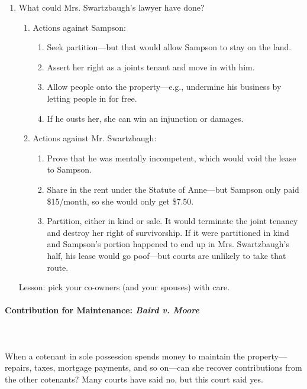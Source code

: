 \begin{enumerate}
    existing contracts giving to Sampson the same right to the possession of 
    the leased property that Swartzbaugh had. It follows that they cannot be 
    cancelled by plaintiff in this action.''\footnote{Casebook p. 354.}
    \item What could Mrs. Swartzbaugh's lawyer have done?
    \begin{enumerate}
        \item Actions against Sampson:
        \begin{enumerate}
            \item Seek partition---but that would allow Sampson to stay on the 
            land.
            \item Assert her right as a joints tenant and move in with him.
            \item Allow people onto the property---e.g., undermine his 
            business by letting people in for free.
            \item If he ousts her, she can win an injunction or damages.
        \end{enumerate}
        \item Actions against Mr. Swartzbaugh:
        \begin{enumerate}
            \item Prove that he was mentally incompetent, which would void the 
            lease to Sampson.
            \item Share in the rent under the Statute of Anne---but Sampson 
            only paid \$15/month, so she would only get \$7.50.
            \item Partition, either in kind or sale. It would terminate the 
            joint tenancy and destroy her right of survivorship. If it were 
            partitioned in kind and Sampson's portion happened to end up in 
            Mrs. Swartzbaugh's half, his lease would go poof---but courts are 
            unlikely to take that route.
        \end{enumerate}
    \end{enumerate}
    Lesson: pick your co-owners (and your spouses) with care.
\end{enumerate}

\paragraph{Contribution for Maintenance: \emph{Baird v. Moore}}
~\\\\When a cotenant in sole possession spends money to maintain the 
property---repairs, taxes, mortgage payments, and so on---can she recover 
contributions from the other cotenants? Many courts have said no, but this 
court said yes.

